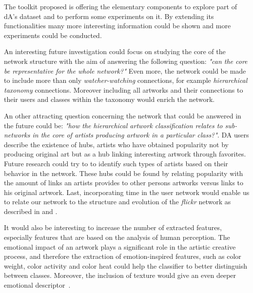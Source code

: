 The toolkit proposed is offering the elementary components to explore part of dA's dataset and to perform some experiments on it. By extending its functionalities many more interesting information could be shown and more experiments could be conducted.

An interesting future investigation could focus on studying the core of the network structure with the aim of answering the following question: \textit{"can the core be representative for the whole network?"}
Even more, the network could be made to include more than only \textit{watcher-watching} connections, for example \textit{hierarchical taxonomy} connections. Moreover including all artworks  and their connections to their users and classes within the taxonomy would enrich the network.

An other attracting question concerning the network that could be answered in the future could be: \textit{"how the hierarchical artwork classification relates to sub-networks in the core of artists producing artwork in a particular class?"}.
DA users describe the existence of hubs, artists who have obtained popularity not by producing original art but as a  hub linking interesting artwork through favorites. Future research could try to to identify such types of artists based on their behavior in the network. These hubs could be found by relating popularity with the amount of links an artists provides to other persons artworks versus links to his original artwork.
Last, incorporating time in the user network would enable us to relate our network to the structure and evolution of the \textit{flickr} network as described in \cite{kumar2006structure} and  \cite{leskovec2008microscopic}.

It would also be interesting to increase the number of extracted features, especially features that are based on the analysis of human perception.
The emotional impact of an artwork plays a significant role in the artistic creative process, and therefore the extraction of emotion-inspired features, such as color weight, color activity and color heat \cite{color_emotion1} could help the classifier to better distinguish between classes.
Moreover, the inclusion of texture would give an even deeper emotional descriptor~\cite{LucassenECCGIV2010}.

